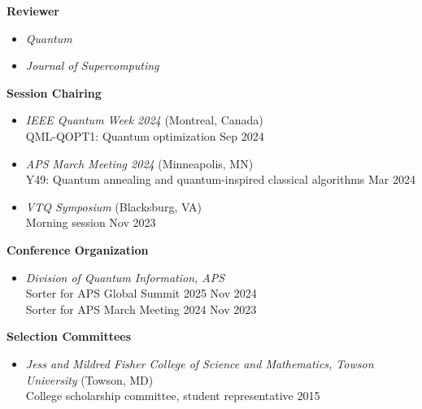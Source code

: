 \documentclass[marginmode, 10pt]{res} %
\begin{document}
\begin{resume}
\textbf{Reviewer}
\begin{itemize}
    \item \textit{Quantum}
    \item \textit{Journal of Supercomputing}
\end{itemize}

\textbf{Session Chairing}
\begin{itemize}
    \item \textit{IEEE Quantum Week 2024} (Montreal, Canada) \\
    QML-QOPT1: Quantum optimization \hfill Sep 2024
    \item \textit{APS March Meeting 2024} (Minneapolis, MN) \\
    Y49: Quantum annealing and quantum-inspired classical algorithms \hfill Mar 2024
    \item \textit{VTQ Symposium} (Blacksburg, VA) \\
    Morning session \hfill Nov 2023
\end{itemize}

\textbf{Conference Organization}
\begin{itemize}
    \item \textit{Division of Quantum Information, APS} \\
    Sorter for APS Global Summit 2025 \hfill Nov 2024 \\
    Sorter for APS March Meeting 2024 \hfill Nov 2023
\end{itemize}

\textbf{Selection Committees}
\begin{itemize}
    \item \textit{Jess and Mildred Fisher College of Science and Mathematics, Towson University} (Towson, MD) \\
    College scholarship committee, student representative \hfill 2015
\end{itemize}


\end{resume}
\end{document}
